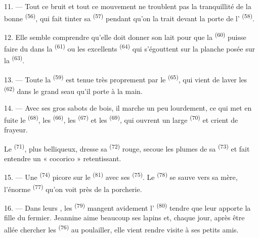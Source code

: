11. --- Tout ce bruit et tout ce mouvement ne troublent pas la tranquillité de la
bonne  \textsuperscript{(56)}, qui fait tinter sa
 \textsuperscript{(57)} pendant qu'on la trait devant la porte
de l' \textsuperscript{(58)}.

12. Elle semble comprendre qu'elle doit donner son lait pour que la
 \textsuperscript{(60)} puisse faire du  dans la
 \textsuperscript{(61)} ou les excellents 
\textsuperscript{(64)} qui s'égouttent sur la planche posée sur la
 \textsuperscript{(63)}.

13. --- Toute la  \textsuperscript{(59)} est tenue très
proprement par le  \textsuperscript{(65)}, qui vient de
laver les  \textsuperscript{(62)} dans le grand seau qu'il
porte à la main.

\VUsaut{3.0mm}
\VUsaut{3.0mm}

14. --- Avec ses gros sabots de bois, il marche un peu lourdement, ce qui met en
fuite le  \textsuperscript{(68)}, les 
\textsuperscript{(66)}, les  \textsuperscript{(67)} et les
 \textsuperscript{(69)}, qui ouvrent un large 
\textsuperscript{(70)} et crient de frayeur.

Le  \textsuperscript{(71)}, plus belliqueux, dresse sa
 \textsuperscript{(72)} rouge, secoue les plumes de sa
 \textsuperscript{(73)} et fait entendre un « cocorico »
retentissant.

15. --- Une  \textsuperscript{(74)} picore sur le
 \textsuperscript{(81)} avec ses 
\textsuperscript{(75)}. Le  \textsuperscript{(78)} se
sauve vers sa mère, l'énorme  \textsuperscript{(77)} qu'on voit
près de la porcherie.

16. --- Dans leurs , les 
\textsuperscript{(79)} mangent avidement l' \textsuperscript{(80)}
tendre que leur apporte la fille du fermier. Jeannine aime beaucoup ses lapins
et, chaque jour, après être allée chercher les 
\textsuperscript{(76)} au poulailler, elle vient rendre visite à ses petits
amis.
\VUsaut{6.0mm}
\VUfilet{22mm}
